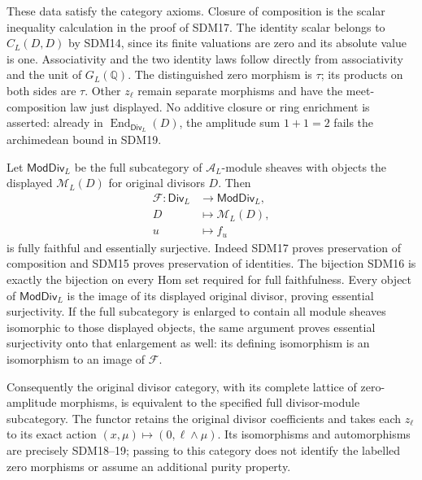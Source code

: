 These data satisfy the category axioms. Closure of composition
is the scalar inequality calculation in the proof of SDM17.
The identity scalar belongs to $C_L(D,D)$ by SDM14, since
its finite valuations are zero and its absolute value is one.
Associativity and the two identity laws follow directly from
associativity and the unit of $G_L(\mathbb Q)$.
The distinguished zero morphism is $\tau$; its products on both
sides are $\tau$. Other $z_\ell$ remain separate morphisms
and have the meet-composition law just displayed.
No additive closure or ring enrichment is asserted: already in
$\operatorname{End}_{\mathsf{Div}_L}(D)$, the amplitude sum
$1+1=2$ fails the archimedean bound in SDM19.

Let $\mathsf{ModDiv}_L$ be the full subcategory of
$\mathcal A_L$-module sheaves with objects the displayed
$\mathcal M_L(D)$ for original divisors $D$. Then
\begin{equation}\tag{SDM21}
\begin{aligned}
\mathcal F:\mathsf{Div}_L&\longrightarrow\mathsf{ModDiv}_L,\\
D&\longmapsto\mathcal M_L(D),\\
u&\longmapsto f_u
\end{aligned}
\end{equation}
is fully faithful and essentially surjective.
Indeed SDM17 proves preservation of composition and SDM15
proves preservation of identities. The bijection SDM16 is
exactly the bijection on every Hom set required for full
faithfulness. Every object of $\mathsf{ModDiv}_L$ is the image
of its displayed original divisor, proving essential
surjectivity. If the full subcategory is enlarged to contain
all module sheaves isomorphic to those displayed objects,
the same argument proves essential surjectivity onto that
enlargement as well: its defining isomorphism is an
isomorphism to an image of $\mathcal F$.

Consequently the original divisor category, with its complete
lattice of zero-amplitude morphisms, is equivalent to the
specified full divisor-module subcategory. The functor retains
the original divisor coefficients and takes each $z_\ell$
to its exact action $(x,\mu)\mapsto(0,\ell\wedge\mu)$.
Its isomorphisms and automorphisms are precisely SDM18--19;
passing to this category does not identify the labelled
zero morphisms or assume an additional purity property.
